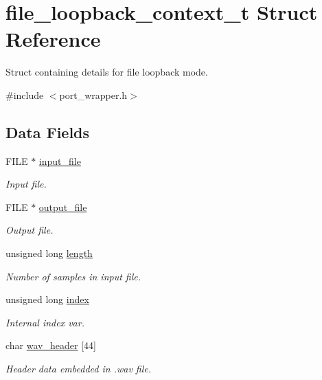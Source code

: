 \hypertarget{structfile__loopback__context__t}{}\section{file\+\_\+loopback\+\_\+context\+\_\+t Struct Reference}
\label{structfile__loopback__context__t}


Struct containing details for file loopback mode.  




{\ttfamily \#include $<$port\+\_\+wrapper.\+h$>$}

\subsection*{Data Fields}
\begin{DoxyCompactItemize}
\item 
F\+I\+LE $\ast$ \mbox{\hyperlink{structfile__loopback__context__t_a7af12b6f866e7f9b67ff5f28ee514581}{input\+\_\+file}}
\begin{DoxyCompactList}\small\item\em Input file. \end{DoxyCompactList}\item 
F\+I\+LE $\ast$ \mbox{\hyperlink{structfile__loopback__context__t_afc47a4ad1f9f0c3855101b48d96061a7}{output\+\_\+file}}
\begin{DoxyCompactList}\small\item\em Output file. \end{DoxyCompactList}\item 
unsigned long \mbox{\hyperlink{structfile__loopback__context__t_a444c3817f1985ad7acd3a94c32fccd90}{length}}
\begin{DoxyCompactList}\small\item\em Number of samples in input file. \end{DoxyCompactList}\item 
unsigned long \mbox{\hyperlink{structfile__loopback__context__t_a3510ddf92f42289c2997199a89eb9e23}{index}}
\begin{DoxyCompactList}\small\item\em Internal index var. \end{DoxyCompactList}\item 
char \mbox{\hyperlink{structfile__loopback__context__t_a87d194451bfb9775cb4ad94f6706f02b}{wav\+\_\+header}} \mbox{[}44\mbox{]}
\begin{DoxyCompactList}\small\item\em Header data embedded in .wav file. \end{DoxyCompactList}\item 

\end{DoxyCompactItemize}
